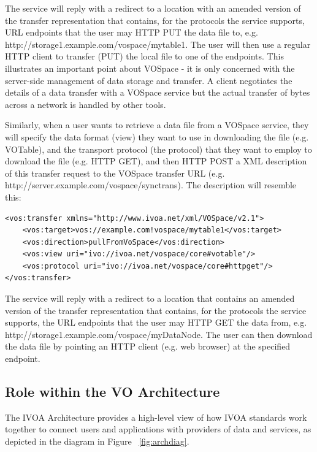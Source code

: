\documentclass[11pt,a4paper]{ivoa}
\begin{document}
The service will reply with a redirect to a location with an amended version of the transfer representation that contains, for the protocols the service supports, URL endpoints that the user may HTTP PUT the data file to, e.g. http://storage1.example.com/vospace/mytable1.  The user will then use a regular HTTP client to transfer (PUT) the local file to one of the endpoints. This illustrates an important point about VOSpace - it is only concerned with the server-side management of data storage and transfer. A client negotiates the details of a data transfer with a VOSpace service but the actual transfer of bytes across a network is handled by other tools.

Similarly, when a user wants to retrieve a data file from a VOSpace service, they will specify the data format (view) they want to use in downloading the file (e.g. VOTable), and the transport protocol (the protocol) that they want to employ to download the file (e.g. HTTP GET), and then HTTP POST a XML description of this transfer request to the VOSpace transfer URL (e.g. http://server.example.com/vospace/synctrans). The description will resemble this:

\begin{lstlisting}
<vos:transfer xmlns="http://www.ivoa.net/xml/VOSpace/v2.1">
    <vos:target>vos://example.com!vospace/mytable1</vos:target>
    <vos:direction>pullFromVoSpace</vos:direction> 
    <vos:view uri="ivo://ivoa.net/vospace/core#votable"/> 
    <vos:protocol uri="ivo://ivoa.net/vospace/core#httpget"/>  
</vos:transfer>
\end{lstlisting}

The service will reply with a redirect to a location that contains an amended version of the transfer representation that contains, for the protocols the service supports, the URL endpoints that the user may HTTP GET the data from, e.g. http://storage1.example.com/vospace/myDataNode. The user can then download the data file by pointing an HTTP client (e.g. web browser) at the specified endpoint.

\subsection{Role within the VO Architecture}
\label{subsec:role within the vo architecture}

The IVOA Architecture \citep{note:VOARCH} provides a high-level view of how IVOA standards work together to connect users and applications with providers of data and services, as depicted in the diagram in Figure ~\ref{fig:archdiag}.
\end{document}
